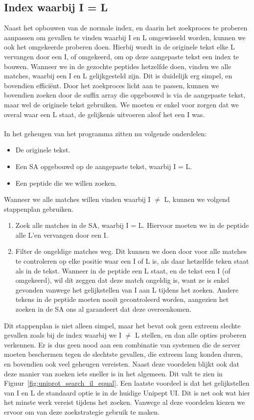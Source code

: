 \subsection{Index waarbij I = L}
Naast het opbouwen van de normale index, en daarin het zoekproces te proberen aanpassen om gevallen te vinden waarbij I en L omgewisseld worden, kunnen we ook het omgekeerde proberen doen.
Hierbij wordt in de originele tekst elke L vervangen door een I, of omgekeerd, om op deze aangepaste tekst een index te bouwen.
Wanneer we in de gezochte peptides hetzelfde doen, vinden we alle matches, waarbij een I en L gelijkgesteld zijn.
Dit is duidelijk erg simpel, en bovendien efficiënt.
Door het zoekproces licht aan te passen, kunnen we bovendien zoeken door de suffix array die opgebouwd is via de aangepaste tekst, maar wel de originele tekst gebruiken.
We moeten er enkel voor zorgen dat we overal waar een L staat, de gelijkenis uitvoeren alsof het een I was.
\\ \\
In het geheugen van het programma zitten nu volgende onderdelen:
\begin{itemize}
    \item De originele tekst.
    \item Een SA opgebouwd op de aangepaste tekst, waarbij I = L\@.
    \item Een peptide die we willen zoeken.
\end{itemize}
Wanneer we alle matches willen vinden waarbij I $\neq$ L, kunnen we volgend stappenplan gebruiken.
\begin{enumerate}
    \item Zoek alle matches in de SA, waarbij I = L\@.
    Hiervoor moeten we in de peptide alle L'en vervangen door een I\@.
    \item Filter de ongeldige matches weg.
    Dit kunnen we doen door voor alle matches te controleren op elke positie waar een I of L is, als daar hetzelfde teken staat als in de tekst.
    Wanneer in de peptide een L staat, en de tekst een I (of omgekeerd), wil dit zeggen dat deze match ongeldig is, want ze is enkel gevonden vanwege het gelijkstellen van I aan L tijdens het zoeken.
    Andere tekens in de peptide moeten nooit gecontroleerd worden, aangezien het zoeken in de SA ons al garandeert dat deze overeenkomen.
\end{enumerate}

Dit stappenplan is niet alleen simpel, maar het bevat ook geen extreem slechte gevallen zoals bij de index waarbij we I $\neq$ L stellen, en dan alle opties proberen verkennen.
Er is dus geen nood aan een combinatie van systemen die de server moeten beschermen tegen de slechtste gevallen, die extreem lang konden duren, en bovendien ook veel geheugen vereisten.
Naast deze voordelen blijkt ook dat deze manier van zoeken iets sneller is in het algemeen.
Dit valt te zien in Figuur~\ref{fig:uniprot_search_il_equal}.
Een laatste voordeel is dat het gelijkstellen van I en L de standaard optie is in de huidige Unipept UI\@.
Dit is net ook wat hier het minste werk vereist tijdens het zoeken.
Vanwege al deze voordelen kiezen we ervoor om van deze zoekstrategie gebruik te maken.


